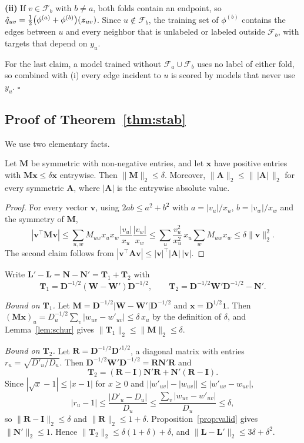 \noindent\textbf{(ii)} If $v\in\mathcal F_b$ with $b\neq a$, both folds contain an endpoint, so $\hat q_{uv}=\tfrac12\bigl(\phi^{(a)}+\phi^{(b)}\bigr)(\bm{z}_{uv})$.
Since $u\notin\mathcal F_b$, the training set of $\phi^{(b)}$ contains the edges between $u$ and every neighbor that is unlabeled or labeled outside $\mathcal F_b$, with targets that depend on $y_u$.

For the last claim, a model trained without $\mathcal F_a\cup\mathcal F_b$ uses no label of either fold, so combined with (i) every edge incident to $u$ is scored by models that never use $y_u$.
\hfill$\square$

\subsection{Proof of Theorem~\ref{thm:stab}}
We use two elementary facts.

\begin{lemma}\label{lem:schur}
Let $\bm M$ be symmetric with non-negative entries, and let $\bm x$ have positive entries with $\bm M\bm x\le\delta\bm x$ entrywise. Then $\|\bm M\|_2\le\delta$. Moreover, $\|\bm A\|_2\le\|\,|\bm A|\,\|_2$ for every symmetric $\bm A$, where $|\bm A|$ is the entrywise absolute value.
\end{lemma}
\begin{proof}
For every vector $\bm v$, using $2ab\le a^2+b^2$ with $a=|v_u|/x_u$, $b=|v_w|/x_w$ and the symmetry of $\bm M$,
\[
|\bm v^{\top}\bm M\bm v|\le\sum_{u,w}M_{uw}x_ux_w\frac{|v_u|}{x_u}\frac{|v_w|}{x_w}
\le\sum_u\frac{v_u^2}{x_u^2}\,x_u\sum_wM_{uw}x_w\le\delta\|\bm v\|_2^2.
\]
The second claim follows from $|\bm v^{\top}\bm A\bm v|\le|\bm v|^{\top}|\bm A|\,|\bm v|$.
\end{proof}

Write $\bm L'-\bm L=\bm N-\bm N'=\bm T_1+\bm T_2$ with
\[
\bm T_1=\bm D^{-1/2}(\bm W-\bm W')\bm D^{-1/2},\qquad
\bm T_2=\bm D^{-1/2}\bm W'\bm D^{-1/2}-\bm N'.
\]

\emph{Bound on $\bm T_1$.}
Let $\bm M=\bm D^{-1/2}|\bm W-\bm W'|\bm D^{-1/2}$ and $\bm x=\bm D^{1/2}\bm 1$.
Then $(\bm M\bm x)_u=D_u^{-1/2}\sum_v|w_{uv}-w'_{uv}|\le\delta\,x_u$ by the definition of $\delta$, and Lemma~\ref{lem:schur} gives $\|\bm T_1\|_2\le\|\bm M\|_2\le\delta$.

\emph{Bound on $\bm T_2$.}
Let $\bm R=\bm D^{-1/2}\bm D'^{1/2}$, a diagonal matrix with entries $r_u=\sqrt{D'_u/D_u}$.
Then $\bm D^{-1/2}\bm W'\bm D^{-1/2}=\bm R\bm N'\bm R$ and
\[
\bm T_2=(\bm R-\bm I)\bm N'\bm R+\bm N'(\bm R-\bm I).
\]
Since $|\sqrt x-1|\le|x-1|$ for $x\ge0$ and $\bigl||w'_{uv}|-|w_{uv}|\bigr|\le|w'_{uv}-w_{uv}|$,
\[
|r_u-1|\le\frac{|D'_u-D_u|}{D_u}\le\frac{\sum_v|w_{uv}-w'_{uv}|}{D_u}\le\delta,
\]
so $\|\bm R-\bm I\|_2\le\delta$ and $\|\bm R\|_2\le1+\delta$.
Proposition~\ref{prop:valid} gives $\|\bm N'\|_2\le1$.
Hence $\|\bm T_2\|_2\le\delta(1+\delta)+\delta$, and $\|\bm L-\bm L'\|_2\le3\delta+\delta^2$.

